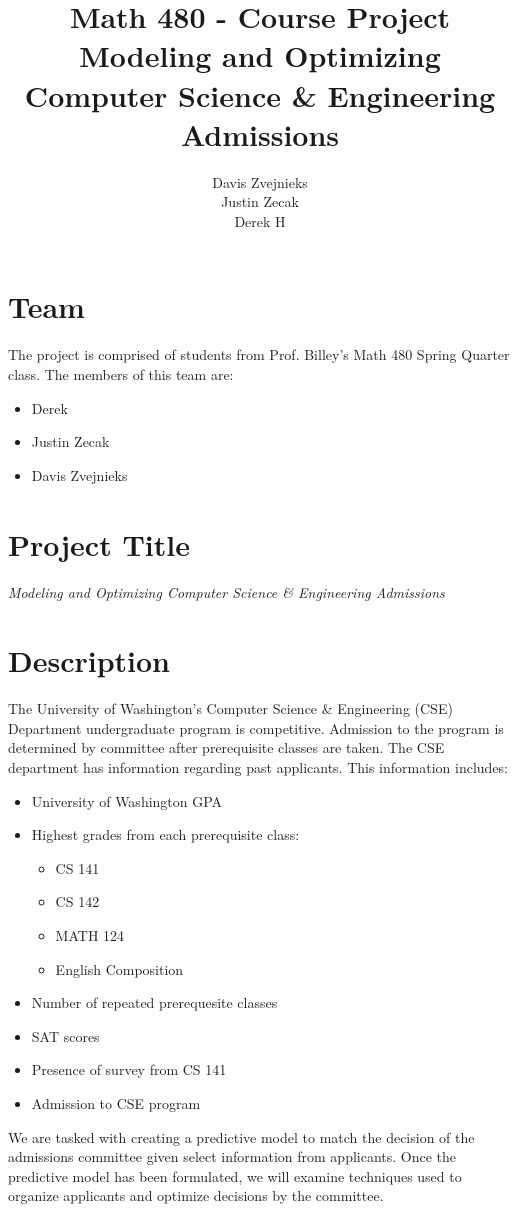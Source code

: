 \documentclass[11pt]{article}
\title{\textbf{Math 480 - Course Project}
			  \\Modeling and Optimizing
			  \\Computer Science \& Engineering Admissions}
\author{Davis Zvejnieks\\
		Justin Zecak\\
		Derek H}
\date{}
\begin{document}
\maketitle

\section{Team}
The project is comprised of students from Prof. Billey's Math 480 Spring Quarter class. The members of this team are:

\begin{itemize}[noitemsep,leftmargin=1in]
\item Derek
\item Justin Zecak
\item Davis Zvejnieks
\end{itemize}



\section{Project Title}
\begin{center}
	\emph{Modeling and Optimizing Computer Science \& Engineering Admissions}
\end{center}


\section{Description}
The University of Washington's Computer Science \& Engineering (CSE) Department undergraduate program is competitive. Admission to the program is determined by committee after prerequisite classes are taken. The CSE department has information regarding past applicants. This information includes:\\
\begin{itemize}[noitemsep, leftmargin=1in]
\item University of Washington GPA
\item Highest grades from each prerequisite class:
	\begin{itemize}
	\item CS 141
	\item CS 142
	\item MATH 124
	\item English Composition
	\end{itemize}
\item Number of repeated prerequesite classes
\item SAT scores
\item Presence of survey from CS 141
\item Admission to CSE program
\end{itemize}
 We are tasked with creating a predictive model to match the decision of the admissions committee given select information from applicants. Once the predictive model has been formulated, we will examine techniques used to organize applicants and optimize decisions by the committee.
\end{document}
